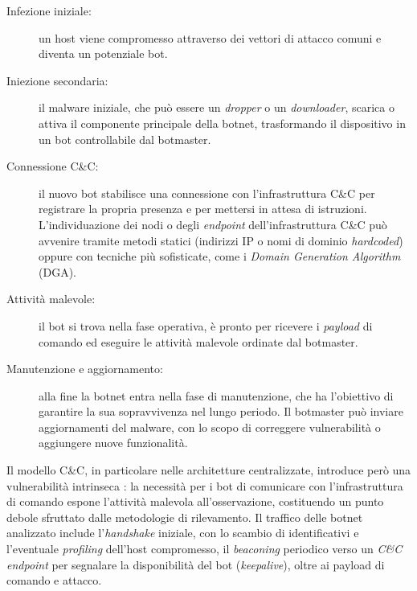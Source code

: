 
\begin{description}
    \item[Infezione iniziale:] un host viene compromesso attraverso dei vettori di attacco comuni e diventa un potenziale bot.
    \item[Iniezione secondaria:] il malware iniziale, che può essere un \emph{dropper} o un \emph{downloader}, scarica o attiva il componente principale della botnet, trasformando il dispositivo in un bot controllabile dal botmaster.
    \item[Connessione C\&C:] il nuovo bot stabilisce una connessione con l'infrastruttura C\&C per registrare la propria presenza e per mettersi in attesa di istruzioni. L'individuazione dei nodi o degli \emph{endpoint} dell'infrastruttura C\&C può avvenire tramite metodi statici (indirizzi IP o nomi di dominio \emph{hardcoded}) oppure con tecniche più sofisticate, come i \emph{Domain Generation Algorithm} (DGA).
    \item[Attività malevole:] il bot si trova nella fase operativa, è pronto per ricevere i \emph{payload} di comando ed eseguire le attività malevole ordinate dal botmaster.
    \item[Manutenzione e aggiornamento:] alla fine la botnet entra nella fase di manutenzione, che ha l'obiettivo di garantire la sua sopravvivenza nel lungo periodo. Il botmaster può inviare aggiornamenti del malware, con lo scopo di correggere vulnerabilità o aggiungere nuove funzionalità.
\end{description}

Il modello C\&C, in particolare nelle architetture centralizzate, introduce però una vulnerabilità intrinseca \cite{silva2013botnets}: la necessità per i bot di comunicare con l'infrastruttura di comando espone l'attività malevola all'osservazione, costituendo un punto debole sfruttato dalle metodologie di rilevamento. Il traffico delle botnet analizzato include l'\emph{handshake} iniziale, con lo scambio di identificativi e l'eventuale \emph{profiling} dell'host compromesso, il \emph{beaconing} periodico verso un \emph{C\&C endpoint} per segnalare la disponibilità del bot (\emph{keepalive}), oltre ai payload di comando e attacco. %

